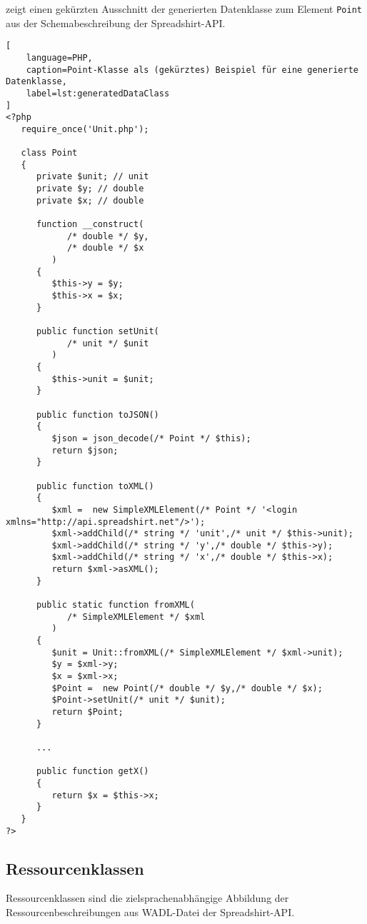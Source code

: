  zeigt einen gekürzten Ausschnitt der generierten Datenklasse zum Element \texttt{Point} aus der Schemabeschreibung der Spreadshirt-\gls{API}.

\begin{lstlisting}[
    language=PHP,
    caption=Point-Klasse als (gekürztes) Beispiel für eine generierte Datenklasse,
    label=lst:generatedDataClass
]
<?php
   require_once('Unit.php');

   class Point
   {
      private $unit; // unit 
      private $y; // double 
      private $x; // double 

      function __construct(
            /* double */ $y,
            /* double */ $x
         )
      {
         $this->y = $y;
         $this->x = $x;
      }

      public function setUnit(
            /* unit */ $unit
         )
      {
         $this->unit = $unit;
      }

      public function toJSON()
      {
         $json = json_decode(/* Point */ $this);
         return $json;
      }

      public function toXML()
      {
         $xml =  new SimpleXMLElement(/* Point */ '<login xmlns="http://api.spreadshirt.net"/>');
         $xml->addChild(/* string */ 'unit',/* unit */ $this->unit);
         $xml->addChild(/* string */ 'y',/* double */ $this->y);
         $xml->addChild(/* string */ 'x',/* double */ $this->x);
         return $xml->asXML();
      }

      public static function fromXML(
            /* SimpleXMLElement */ $xml
         )
      {
         $unit = Unit::fromXML(/* SimpleXMLElement */ $xml->unit);
         $y = $xml->y;
         $x = $xml->x;
         $Point =  new Point(/* double */ $y,/* double */ $x);
         $Point->setUnit(/* unit */ $unit);
         return $Point;
      }

      ...

      public function getX()
      {
         return $x = $this->x;
      }
   }
?>
\end{lstlisting}

\subsection{Ressourcenklassen}
\label{sec:ressourceclasses}

Ressourcenklassen sind die zielsprachenabhängige Abbildung der Ressourcenbeschreibungen aus WADL-Datei der Spreadshirt-\gls{API}.

